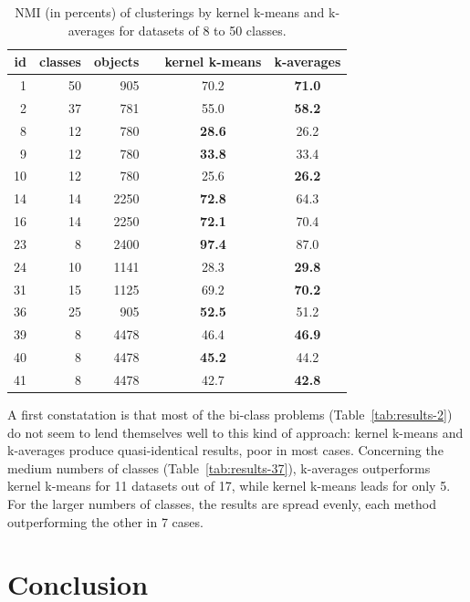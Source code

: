 \documentclass[natbib,smallextended]{svjour3}
\begin{document}

\begin{table}
\begin{center}
\caption{NMI (in percents) of clusterings by kernel k-means and k-averages for datasets of 8 to 50 classes.}
\label{tab:results-8}
\begin{tabular}{rrrccc}
id & classes & objects & & kernel k-means & k-averages \\
\hline
 1 & 50 &  905 &  & 70.2 & \textbf{71.0} \\
 2 & 37 &  781 &  & 55.0 & \textbf{58.2} \\
 8 & 12 &  780 &  & \textbf{28.6} & 26.2 \\
 9 & 12 &  780 &  & \textbf{33.8} & 33.4 \\
10 & 12 &  780 &  & 25.6 & \textbf{26.2} \\
14 & 14 & 2250 &  & \textbf{72.8} & 64.3 \\
16 & 14 & 2250 &  & \textbf{72.1} & 70.4 \\
23 &  8 & 2400 &  & \textbf{97.4} & 87.0 \\
24 & 10 & 1141 &  & 28.3 & \textbf{29.8} \\
31 & 15 & 1125 &  & 69.2 & \textbf{70.2} \\
36 & 25 &  905 &  & \textbf{52.5} & 51.2 \\
39 &  8 & 4478 &  & 46.4 & \textbf{46.9} \\
40 &  8 & 4478 &  & \textbf{45.2} & 44.2 \\
41 &  8 & 4478 &  & 42.7 & \textbf{42.8} \\
\end{tabular}
\end{center}
\end{table}

A first constatation is that most of the bi-class problems (Table~\ref{tab:results-2}) do not seem to lend themselves well to this kind of approach: kernel k-means and k-averages produce quasi-identical results, poor in most cases. Concerning the medium numbers of classes (Table~\ref{tab:results-37}), k-averages outperforms kernel k-means for 11 datasets out of 17, while kernel k-means leads for only 5. For the larger numbers of classes, the results are spread evenly, each method outperforming the other in 7 cases.

\section{Conclusion}
\end{document}
